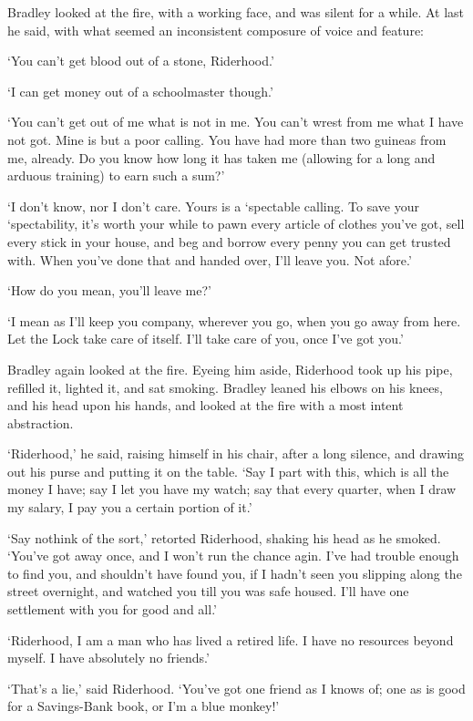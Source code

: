 Bradley looked at the fire, with a working face, and was silent for a
while. At last he said, with what seemed an inconsistent composure of
voice and feature:

‘You can’t get blood out of a stone, Riderhood.’

‘I can get money out of a schoolmaster though.’

‘You can’t get out of me what is not in me. You can’t wrest from me what
I have not got. Mine is but a poor calling. You have had more than two
guineas from me, already. Do you know how long it has taken me (allowing
for a long and arduous training) to earn such a sum?’

‘I don’t know, nor I don’t care. Yours is a ‘spectable calling. To
save your ‘spectability, it’s worth your while to pawn every article of
clothes you’ve got, sell every stick in your house, and beg and borrow
every penny you can get trusted with. When you’ve done that and handed
over, I’ll leave you. Not afore.’

‘How do you mean, you’ll leave me?’

‘I mean as I’ll keep you company, wherever you go, when you go away from
here. Let the Lock take care of itself. I’ll take care of you, once I’ve
got you.’

Bradley again looked at the fire. Eyeing him aside, Riderhood took up
his pipe, refilled it, lighted it, and sat smoking. Bradley leaned his
elbows on his knees, and his head upon his hands, and looked at the fire
with a most intent abstraction.

‘Riderhood,’ he said, raising himself in his chair, after a long
silence, and drawing out his purse and putting it on the table. ‘Say
I part with this, which is all the money I have; say I let you have
my watch; say that every quarter, when I draw my salary, I pay you a
certain portion of it.’

‘Say nothink of the sort,’ retorted Riderhood, shaking his head as he
smoked. ‘You’ve got away once, and I won’t run the chance agin. I’ve had
trouble enough to find you, and shouldn’t have found you, if I hadn’t
seen you slipping along the street overnight, and watched you till you
was safe housed. I’ll have one settlement with you for good and all.’

‘Riderhood, I am a man who has lived a retired life. I have no resources
beyond myself. I have absolutely no friends.’

‘That’s a lie,’ said Riderhood. ‘You’ve got one friend as I knows of;
one as is good for a Savings-Bank book, or I’m a blue monkey!’

